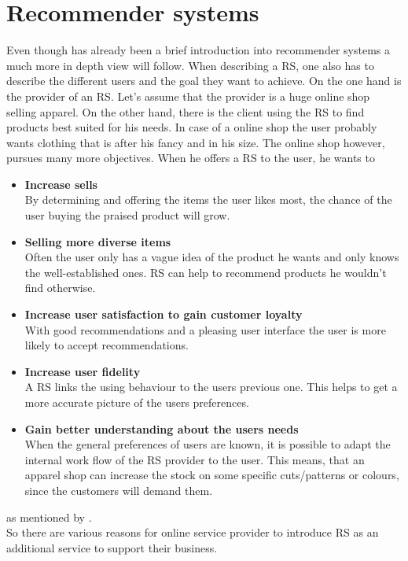 

\section{Recommender systems}
\iffalse Aufgaben eines Recommender systems \fi
Even though has already been a brief introduction into recommender systems a much more in depth view will follow.
When describing a RS, one also has to describe the different users and the goal they want to achieve.
On the one hand is the provider of an RS.
Let's assume that the provider is a huge online shop selling apparel.
On the other hand, there is the client using the RS to find products best suited for his needs.
In case of a online shop the user probably wants clothing that is after his fancy and in his size.
The online shop however, pursues many more objectives.
When he offers a RS to the user, he wants to
\begin{itemize}
    \item\textbf{Increase sells}\hfill\\
        By determining and offering the items the user likes most, the chance of the user buying the praised product will grow.
    \item\textbf{Selling more diverse items}\hfill\\
        Often the user only has a vague idea of the product he wants and only knows the well-established ones.
        RS can help to recommend products he wouldn't find otherwise.
    \item\textbf{Increase user satisfaction to gain customer loyalty}\hfill\\
        With good recommendations and a pleasing user interface the user is more likely to accept recommendations.
    \item\textbf{Increase user fidelity}\hfill\\
        A RS links the using behaviour to the users previous one.
        This helps to get a more accurate picture of the users preferences.
    \item\textbf{Gain better understanding about the users needs}\hfill\\
        When the general preferences of users are known, it is possible to adapt the internal work flow of the RS provider to the user.
        This means, that an apparel shop can increase the stock on some specific cuts/patterns or colours, since the customers will demand them.
\end{itemize}
as mentioned by \citeauthor[p.~4-5]{ricci:2011}.\\
So there are various reasons for online service provider to introduce RS as an additional service to support their business.

